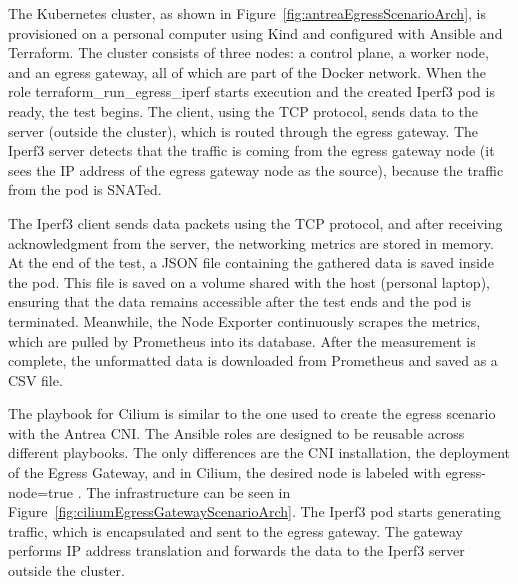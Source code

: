 The Kubernetes cluster, as shown in Figure~\ref{fig:antreaEgressScenarioArch}, is provisioned on a personal computer using Kind and configured with Ansible and Terraform. The cluster consists of three nodes: a control plane, a worker node, and an egress gateway, all of which are part of the Docker network. When the role terraform\_run\_egress\_iperf starts execution and the created Iperf3 pod is ready, the test begins. The client, using the TCP protocol, sends data to the server (outside the cluster), which is routed through the egress gateway. The Iperf3 server detects that the traffic is coming from the egress gateway node (it sees the IP address of the egress gateway node as the source), because the traffic from the pod is SNATed.

The Iperf3 client sends data packets using the TCP protocol, and after receiving acknowledgment from the server, the networking metrics are stored in memory. At the end of the test, a JSON file containing the gathered data is saved inside the pod. This file is saved on a volume shared with the host (personal laptop), ensuring that the data remains accessible after the test ends and the pod is terminated. Meanwhile, the Node Exporter continuously scrapes the metrics, which are pulled by Prometheus into its database. After the measurement is complete, the unformatted data is downloaded from Prometheus and saved as a CSV file.




The playbook for Cilium is similar to the one used to create the egress scenario with the Antrea CNI. The Ansible roles are designed to be reusable across different playbooks. The only differences are the CNI installation, the deployment of the Egress Gateway, and in Cilium, the desired node is labeled with egress-node=true \cite{CiliumEgressGateway}. The infrastructure can be seen in Figure~\ref{fig:ciliumEgressGatewayScenarioArch}. The Iperf3 pod starts generating traffic, which is encapsulated and sent to the egress gateway. The gateway performs IP address translation and forwards the data to the Iperf3 server outside the cluster.

